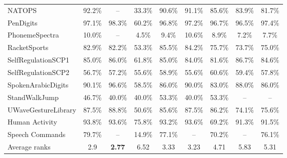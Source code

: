 \documentclass{article}
\theoremstyle{definition}
\theoremstyle{remark}
\begin{document}
\begin{table}[h]
\begin{tabular}{lcccccccc}
	NATOPS & 92.2\% & -- & 33.3\% & 90.6\% & 91.1\% & 85.6\% & 83.9\% & 81.7\% \\
	PenDigits & 97.1\% & 98.3\% & 60.2\% & 96.8\% & 97.2\% & 96.7\% & 96.5\% & 97.4\% \\
	PhonemeSpectra & 10.0\% & -- & 4.5\% & 9.4\% & 10.6\% & 8.9\% & 7.2\% & 7.7\% \\
	RacketSports & 82.9\% & 82.2\% & 53.3\% & 85.5\% & 84.2\% & 75.7\% & 73.7\% & 75.0\% \\
	SelfRegulationSCP1 & 85.0\% & 86.0\% & 61.8\% & 85.0\% & 84.0\% & 81.6\% & 86.7\% & 84.6\% \\
	SelfRegulationSCP2 & 56.7\% & 57.2\% & 55.6\% & 58.9\% & 55.6\% & 60.6\% & 59.4\% & 57.8\% \\
	SpokenArabicDigits & 90.1\% & 96.6\% & 58.5\% & 86.0\% & 90.0\% & 83.0\% & 88.0\% & 86.0\% \\
	StandWalkJump & 46.7\% & 40.0\% & 40.0\% & 53.3\% & 40.0\% & 53.3\% & -- & -- \\
	UWaveGestureLibrary & 87.5\% & 88.8\% & 50.6\% & 85.6\% & 87.5\% & 86.2\% & 74.1\% & 75.6\% \\
	Human Activity & 93.8\% & 93.6\% & 75.8\% & 93.2\% & 93.6\% & 69.2\% & 91.3\% & 91.5\% \\
	Speech Commands & 79.7\% & -- & 14.9\% & 77.1\% & -- & 70.2\% & -- & 76.1\% \\
	\midrule
	Average ranks & 2.9 & \textbf{2.77} & 6.52 & 3.33 & 3.23 & 4.71 & 5.83 & 5.31\\
	\bottomrule
	\end{tabular}
	\end{table}
\end{document}
